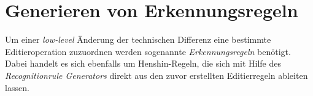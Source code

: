 \section{Generieren von Erkennungsregeln}

Um einer \textit{low-level} Änderung der technischen Differenz eine bestimmte Editieroperation zuzuordnen werden sogenannte \textit{Erkennungsregeln} benötigt. 
Dabei handelt es sich ebenfalls um Henshin-Regeln, die sich mit Hilfe des \textit{Recognitionrule Generators} direkt aus den zuvor erstellten Editierregeln ableiten lassen.







